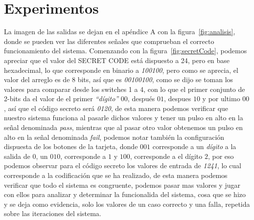 \documentclass[a4paper, 12pt]{article}
\begin{document}
    \section{Experimentos}
    La imagen de las salidas se dejan en el apéndice A con la figura~\ref{fig:analisis}, donde se pueden ver las diferentes señales que comprueban el correcto funcionamiento del sistema.
    Comenzando con la figura~\ref{fig:secretCode}, podemos apreciar que el valor del SECRET CODE está dispuesto a 24, pero en base hexadecimal, lo que corresponde en binario a \emph{100100}, pero como se aprecia, el valor del arreglo es de 8 bits, así que es \emph{00100100}, como se dijo se toman los valores para comparar desde los switches 1 a 4, con lo que el primer conjunto de 2-bits da el valor de el primer \emph{“dígito”} $00$, después $01$, despues $10$ y por ultimo $00$, así que el código secreto será \emph{0120}, de esta manera podemos verificar que nuestro sistema funciona al pasarle dichos valores y tener un pulso en alto en la señal denominada \emph{pass}, mientras que al pasar otro valor obtenemos un pulso en alto en la señal denominada \emph{fail}, podemos notar también la configuración dispuesta de los botones de la tarjeta, donde $001$ corresponde a un \emph{dígito} a la salida de $0$, un $010$, corresponde a $1$ y $100$, corresponde a el dígito $2$, por eso podemos observar para el código secreto los valores de entrada de \emph{1241}, lo cual corresponde a la codificación que se ha realizado, de esta manera podemos verificar que todo el sistema es congruente, podemos pasar mas valores y jugar con ellos para analizar y determinar la funcionalida del sistema, cosa que se hizo y se deja como evidencia, solo los valores de un caso correcto y una falla, repetida sobre las iteraciones del sistema.
    
\end{document}
